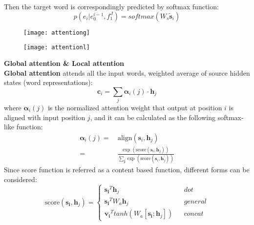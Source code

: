 Then the target word is correspondingly predicted by softmax function:
\[  p(e_i|e_0^{i-1}, f_1^J) = softmax(W_s \tilde{\bm{s}}_i)\] 
%	
\begin{figure}
	\centering
	\begin{minipage}{.5\textwidth}
		\centering
		\texttt{[image: attentiong]}
		\label{fig:test1}
	\end{minipage}%
	\begin{minipage}{.5\textwidth}
		\centering
		\texttt{[image: attentionl]}
		\label{fig:test2}
	\end{minipage}
\end{figure}
%


\textbf{Global attention \& Local attention } \\
\textbf{Global attention} attends all the input words, weighted average of source hidden states (word representations):
\[ \bm{c}_i = \sum_{j} \bm{\alpha}_i(j)\cdot  \bm{h}_j \]
where $\bm{\alpha}_i(j)$ is the normalized attention weight that output at position $i$ is aligned with input position $j$, and it can be calculated as the following softmax-like function:
\begin{align}
\bm{\alpha}_i(j) = & \ \text{align}(\bm{s}_i, {\bm{h}}_j) \\
= & \ \frac{\text{exp\ }(\text{score}(\bm{s}_i, {\bm{h}}_j))}{\sum_{\bm{j}^{\prime}} \text{exp\ }(\text{score}(\bm{s}_i, {\bm{h}}_j^{\prime}))}
\end{align}
Since score function is referred as a content based function, different forms can be considered:
\begin{equation}
\text{score}(\bm{s_i}, {\bm{h}}_j)=\left\{
\begin{array}{lcl}
{\bm{s_i}}^T {\bm{h}}_j & & dot\\
{\bm{s_i}}^T W_a {\bm{h}}_j & & general\\
{\bm{v_i}}^T tanh(W_a[\bm{s_i}; {\bm{h}}_j]) & & concat
\end{array} \right.
\end{equation}




